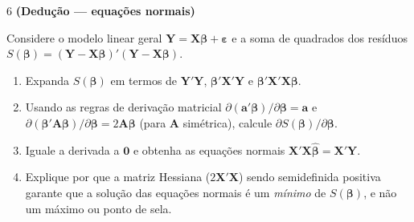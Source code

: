 \documentclass[11pt]{article}
\begin{document}
\begin{questao}{6} \textbf{(Dedução --- equações normais)}

Considere o modelo linear geral $\mathbf{Y} = \mathbf{X}\boldsymbol\beta + \boldsymbol\varepsilon$
e a soma de quadrados dos resíduos $S(\boldsymbol\beta) = (\mathbf{Y} -
\mathbf{X}\boldsymbol\beta)'(\mathbf{Y} - \mathbf{X}\boldsymbol\beta)$.

\begin{enumerate}[label=(\alph*)]
  \item Expanda $S(\boldsymbol\beta)$ em termos de $\mathbf{Y}'\mathbf{Y}$,
    $\boldsymbol\beta'\mathbf{X}'\mathbf{Y}$ e $\boldsymbol\beta'\mathbf{X}'\mathbf{X}\boldsymbol\beta$.
  \item Usando as regras de derivação matricial $\partial(\mathbf{a}'\boldsymbol\beta)/\partial
    \boldsymbol\beta = \mathbf{a}$ e $\partial(\boldsymbol\beta'\mathbf{A}\boldsymbol\beta)/\partial
    \boldsymbol\beta = 2\mathbf{A}\boldsymbol\beta$ (para $\mathbf{A}$ simétrica), calcule
    $\partial S(\boldsymbol\beta)/\partial \boldsymbol\beta$.
  \item Iguale a derivada a $\mathbf{0}$ e obtenha as equações normais
    $\mathbf{X}'\mathbf{X}\hat{\boldsymbol\beta} = \mathbf{X}'\mathbf{Y}$.
  \item Explique por que a matriz Hessiana ($2\mathbf{X}'\mathbf{X}$) sendo semidefinida positiva
    garante que a solução das equações normais é um \emph{mínimo} de $S(\boldsymbol\beta)$, e não
    um máximo ou ponto de sela.
\end{enumerate}
\end{questao}
\end{document}
